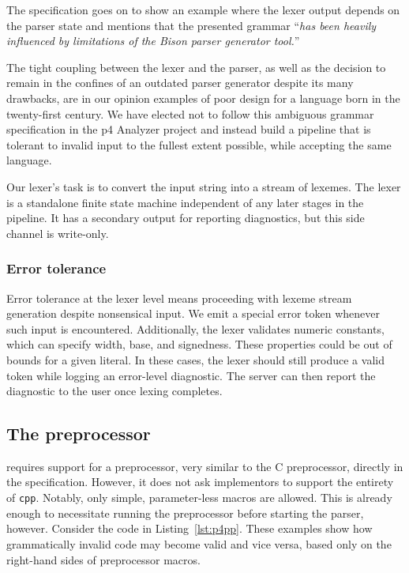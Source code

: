 The specification goes on to show an example where the lexer output depends on
the parser state and mentions that the presented grammar ``\textit{has been heavily
influenced by limitations of the Bison parser generator tool.}''

The tight coupling between the lexer and the parser, as well as the decision to
remain in the confines of an outdated parser generator despite its many
drawbacks, are in our opinion examples of poor design for a language born in the
twenty-first century. We have elected not to follow this ambiguous grammar
specification in the \acrshort{p4} Analyzer project and instead build a pipeline
that is tolerant to invalid input to the fullest extent possible, while
accepting the same language.

Our lexer's task is to convert the input string into a stream of lexemes. The
lexer is a standalone finite state machine independent of any later stages in
the pipeline. It has a secondary output for reporting diagnostics, but this side
channel is write-only.

\subsubsection*{Error tolerance}

Error tolerance at the lexer level means proceeding with lexeme stream
generation despite nonsensical input. We emit a special error token whenever
such input is encountered. Additionally, the lexer validates numeric constants,
which can specify width, base, and signedness. These properties could be out of
bounds for a given literal. In these cases, the lexer should still produce a
valid token while logging an error-level diagnostic. The server can then report
the diagnostic to the user once lexing completes.


\subsection{The preprocessor}

\pfs requires support for a preprocessor, very similar to the C preprocessor,
directly in the specification. However, it does not ask implementors to support
the entirety of \texttt{cpp}. Notably, only simple, parameter-less macros are
allowed. This is already enough to necessitate running the preprocessor before
starting the parser, however. Consider the code in Listing~\ref{lst:p4pp}. These
examples show how grammatically invalid code may become valid and vice versa,
based only on the right-hand sides of preprocessor macros.

